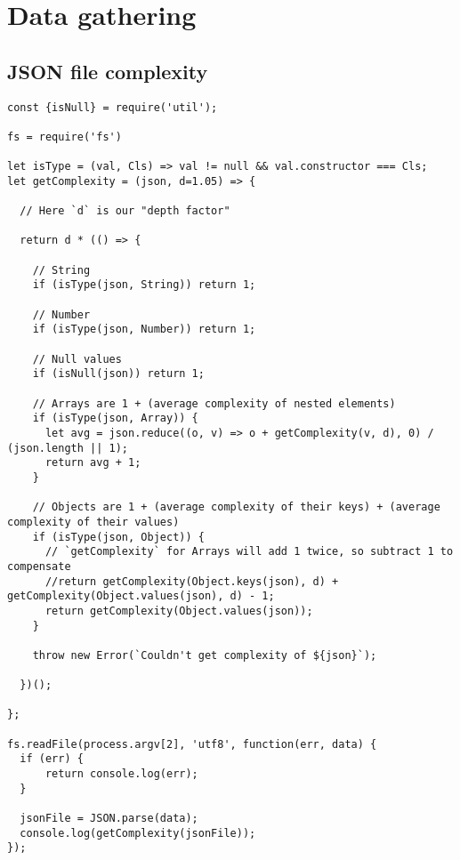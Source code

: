 \documentclass[../thesis.tex]{subfiles}
\begin{document}
\appendix
\chapter{Data gathering}
\section{JSON file complexity}\label{appendix:complexity_algorithm}
\begin{lstlisting}[caption=JavaScript script to compute the complexity of a JSON file]
const {isNull} = require('util');

fs = require('fs')

let isType = (val, Cls) => val != null && val.constructor === Cls;
let getComplexity = (json, d=1.05) => {
  
  // Here `d` is our "depth factor"
  
  return d * (() => {

    // String
    if (isType(json, String)) return 1;

    // Number
    if (isType(json, Number)) return 1;

    // Null values 
    if (isNull(json)) return 1;

    // Arrays are 1 + (average complexity of nested elements)
    if (isType(json, Array)) {
      let avg = json.reduce((o, v) => o + getComplexity(v, d), 0) / (json.length || 1);
      return avg + 1;
    }

    // Objects are 1 + (average complexity of their keys) + (average complexity of their values)
    if (isType(json, Object)) {
      // `getComplexity` for Arrays will add 1 twice, so subtract 1 to compensate
      //return getComplexity(Object.keys(json), d) + getComplexity(Object.values(json), d) - 1;
      return getComplexity(Object.values(json));
    }

    throw new Error(`Couldn't get complexity of ${json}`);
    
  })();
  
};

fs.readFile(process.argv[2], 'utf8', function(err, data) {
  if (err) {
      return console.log(err);
  }

  jsonFile = JSON.parse(data);
  console.log(getComplexity(jsonFile));
});

\end{lstlisting}
\end{document}
